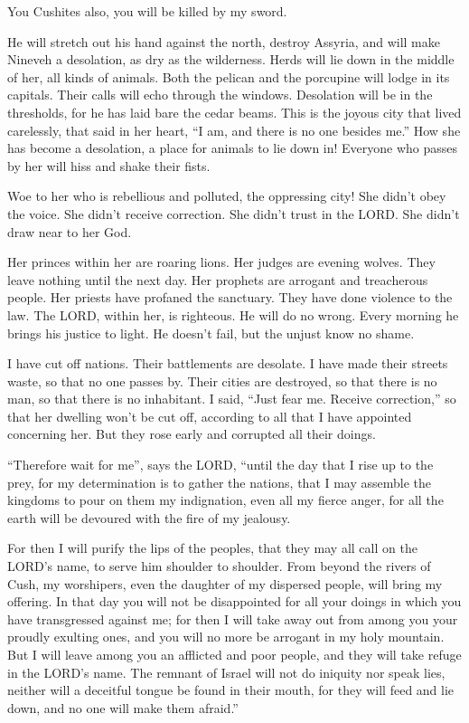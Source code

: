 \myverse{}You Cushites also, you will be killed by my sword.


\myverse{}He will stretch out his hand against the north, destroy Assyria, and will make Nineveh a desolation, as dry as the wilderness. \myverse{}Herds will lie down in the middle of her, all kinds of animals. Both the pelican and the porcupine will lodge in its capitals. Their calls will echo through the windows. Desolation will be in the thresholds, for he has laid bare the cedar beams. \myverse{}This is the joyous city that lived carelessly, that said in her heart, “I am, and there is no one besides me.” How she has become a desolation, a place for animals to lie down in! Everyone who passes by her will hiss and shake their fists.


\mychapter{} \myverse*{}Woe to her who is rebellious and polluted, the oppressing city! \myverse{}She didn’t obey the voice. She didn’t receive correction. She didn’t trust in the LORD. She didn’t draw near to her God.


\myverse{}Her princes within her are roaring lions. Her judges are evening wolves. They leave nothing until the next day. \myverse{}Her prophets are arrogant and treacherous people. Her priests have profaned the sanctuary. They have done violence to the law. \myverse{}The LORD, within her, is righteous. He will do no wrong. Every morning he brings his justice to light. He doesn’t fail, but the unjust know no shame.


\myverse{}I have cut off nations. Their battlements are desolate. I have made their streets waste, so that no one passes by. Their cities are destroyed, so that there is no man, so that there is no inhabitant. \myverse{}I said, “Just fear me. Receive correction,” so that her dwelling won’t be cut off, according to all that I have appointed concerning her. But they rose early and corrupted all their doings.


\myverse{}“Therefore wait for me”, says the LORD, “until the day that I rise up to the prey, for my determination is to gather the nations, that I may assemble the kingdoms to pour on them my indignation, even all my fierce anger, for all the earth will be devoured with the fire of my jealousy.


\myverse{}For then I will purify the lips of the peoples, that they may all call on the LORD’s name, to serve him shoulder to shoulder. \myverse{}From beyond the rivers of Cush, my worshipers, even the daughter of my dispersed people, will bring my offering. \myverse{}In that day you will not be disappointed for all your doings in which you have transgressed against me; for then I will take away out from among you your proudly exulting ones, and you will no more be arrogant in my holy mountain. \myverse{}But I will leave among you an afflicted and poor people, and they will take refuge in the LORD’s name. \myverse{}The remnant of Israel will not do iniquity nor speak lies, neither will a deceitful tongue be found in their mouth, for they will feed and lie down, and no one will make them afraid.”


